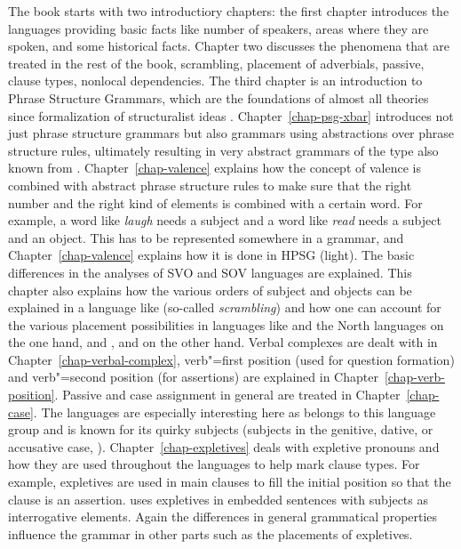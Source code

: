The book starts with two introductiory chapters: the first chapter introduces the  languages
providing basic facts like number of speakers, areas where they are spoken, and some historical
facts. Chapter two discusses the phenomena that are treated in the rest of the book, \eg scrambling,
placement of adverbials, passive, clause types, nonlocal dependencies. The third chapter is an
introduction to Phrase Structure Grammars, which are the foundations of almost all theories since
 formalization of structuralist ideas
\citep{Bloomfield33a-u}. Chapter~\ref{chap-psg-xbar} introduces not just phrase structure grammars
but also grammars using abstractions over phrase structure rules, ultimately resulting in very
abstract grammars of the type also known from \xbart
\citep{Jackendoff77a}. Chapter~\ref{chap-valence} explains how the concept of valence is combined
with abstract phrase structure rules to make sure that the right number and the right kind of
elements is combined with a certain word. For example, a word like \emph{laugh} needs a subject and
a word like \emph{read} needs a subject and an object. This has to be represented somewhere in a
grammar, and Chapter~\ref{chap-valence} explains how it is done in HPSG (light). The basic differences
in the analyses of SVO and SOV languages are explained. This chapter also
explains how the various orders of subject and objects can be explained in a language like 
(so-called \emph{scrambling}) and how one can account for the various placement possibilities in languages like 
and the North  languages on the one hand, and ,  and  on the other hand. Verbal complexes are dealt with in Chapter~\ref{chap-verbal-complex}, verb"=first position (used for question formation) and verb"=second position (for assertions) are explained
in Chapter~\ref{chap-verb-position}. Passive and case assignment in general are treated in
Chapter~\ref{chap-case}. The  languages are especially interesting here as 
belongs to this language group and is known for its quirky subjects (subjects in the genitive, dative, or
accusative case, \citealp{ZMT85a}). Chapter~\ref{chap-expletives} deals with expletive pronouns and how they are used
throughout the  languages to help mark clause types. For example, expletives are used in
 main clauses to fill the initial position so that the clause is an assertion.  uses
expletives in embedded sentences with subjects as interrogative elements. Again the differences in
general grammatical properties influence the grammar in other parts such as the placements of expletives. 

